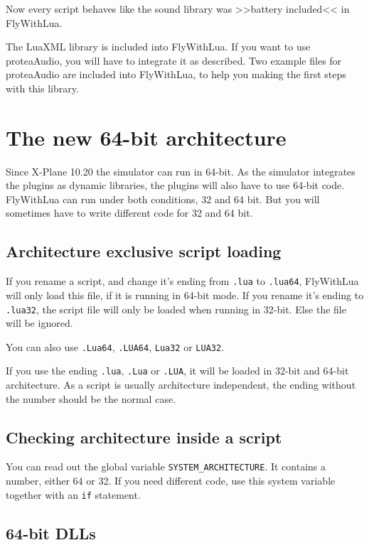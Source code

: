 \documentclass[11pt,parskip=half,a4paper]{scrartcl}
\begin{document}
Now every script behaves like the sound library was >>battery included<< in FlyWithLua. 

The LuaXML library is included into FlyWithLua. If you want to use proteaAudio, you will have to integrate it as described. Two example files for proteaAudio are included into FlyWithLua, to help you making the first steps with this library.

\section{The new 64-bit architecture}

Since X-Plane 10.20 the simulator can run in 64-bit. As the simulator integrates the plugins as dynamic libraries, the plugins will also have to use 64-bit code. FlyWithLua can run under both conditions, 32 and 64 bit. But you will sometimes have to write different code for 32 and 64 bit.

\subsection{Architecture exclusive script loading}

If you rename a script, and change it's ending from \verb|.lua| to \verb|.lua64|, FlyWithLua will only load this file, if it is running in 64-bit mode. If you rename it's ending to \verb|.lua32|, the script file will only be loaded when running in 32-bit. Else the file will be ignored.

You can also use \verb|.Lua64|, \verb|.LUA64|, \verb|Lua32| or \verb|LUA32|.

If you use the ending \verb|.lua|, \verb|.Lua| or \verb|.LUA|, it will be loaded in 32-bit and 64-bit architecture. As a script is usually architecture independent, the ending without the number should be the normal case.

\subsection{Checking architecture inside a script}

You can read out the global variable \verb|SYSTEM_ARCHITECTURE|. It contains a number, either 64 or 32. If you need different code, use this system variable together with an \verb|if| statement.

\subsection{64-bit DLLs}
\end{document}

